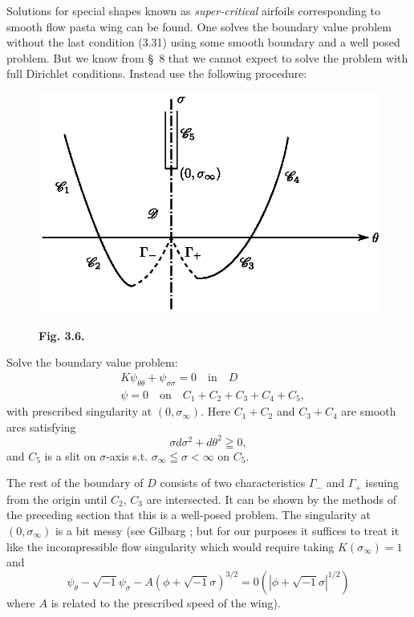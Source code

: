 Solutions for special shapes known as {\em super-critical} airfoils corresponding to smooth flow pasta wing can be found. One solves the boundary value problem without the last condition (3.31) using some smooth boundary and a well posed problem. But we know from \S\ 8 that we cannot expect to solve the problem with full Dirichlet conditions. Instead use the following procedure:
\begin{figure}[H]
\centering
\includegraphics{figures/fig3.6.eps}
\centerline{\bf Fig. 3.6.}
\end{figure}\pageoriginale

Solve the boundary value problem:
\begin{align*}
& K \psi_{\theta \theta} + \psi_{\sigma \sigma} = 0 \quad \text{in}\quad D\\
& \psi = 0 \quad \text{on} \quad C_1 + C_2 + C_3 + C_4 + C_5, 
\end{align*}
with prescribed singularity at $(0, \sigma_\infty)$. Here $C_1+ C_2$ and $C_3+C_4$ are smooth arcs satisfying 
$$
\sigma d\sigma^2 + d\theta^2 \geqq 0,
$$
and $C_5$ is a slit on $\sigma$-axis s.t. $\sigma_\infty \leqq \sigma < \infty$ on $C_5$. 

The rest of the boundary of $D$ consists of two characteristics $\Gamma_-$ and $\Gamma_+$ issuing from the origin until $C_2$, $C_3$ are intersected. It can be shown by the methods of the preceding section that this is a well-posed problem. The singularity at $(0, \sigma_\infty)$ is a bit messy (see Gilbarg \cite{key14}; but for our purposes it suffices to treat it like the incompressible flow singularity which would require taking $K(\sigma_\infty) = 1$ and 
\begin{equation*}
\psi_\theta - \sqrt{-1} \psi_\sigma - A (\phi + \sqrt{-1} \sigma)^{3/2} = 0 (|\phi +\sqrt{-1} \sigma |^{1/2}) \tag{3.32}\label{eq3.32}
\end{equation*}\pageoriginale
where $A$ is related to the prescribed speed of the wing).

